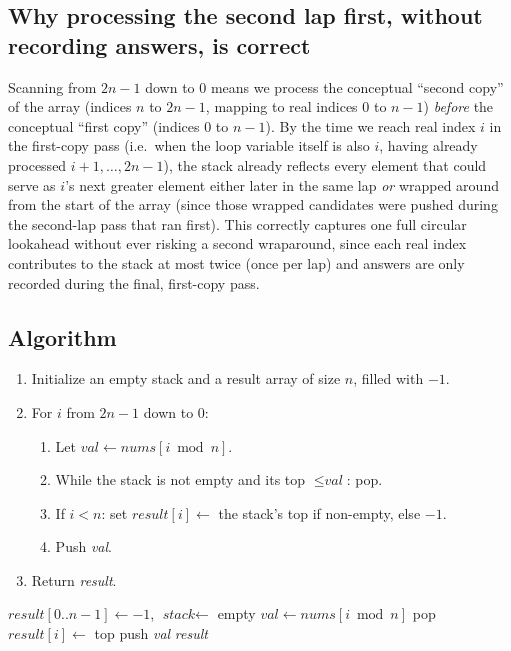 \subsection*{Why processing the second lap first, without recording answers, is correct}

Scanning from $2n-1$ down to $0$ means we process the conceptual ``second
copy'' of the array (indices $n$ to $2n-1$, mapping to real indices $0$
to $n-1$) \emph{before} the conceptual ``first copy'' (indices $0$ to
$n-1$). By the time we reach real index $i$ in the first-copy pass (i.e.\
when the loop variable itself is also $i$, having already processed
$i+1, \dots, 2n-1$), the stack already reflects every element that could
serve as $i$'s next greater element either later in the same lap
\emph{or} wrapped around from the start of the array (since those wrapped
candidates were pushed during the second-lap pass that ran first). This
correctly captures one full circular lookahead without ever risking a
second wraparound, since each real index contributes to the stack at most
twice (once per lap) and answers are only recorded during the final,
first-copy pass.

\subsection*{Algorithm}

\begin{enumerate}
  \item Initialize an empty stack and a result array of size $n$, filled
        with $-1$.
  \item For $i$ from $2n-1$ down to $0$:
  \begin{enumerate}
    \item Let $\textit{val} \gets \textit{nums}[i \bmod n]$.
    \item While the stack is not empty and its top $\le \textit{val}$:
          pop.
    \item If $i < n$: set $\textit{result}[i] \gets$ the stack's top if
          non-empty, else $-1$.
    \item Push \textit{val}.
  \end{enumerate}
  \item Return \textit{result}.
\end{enumerate}

\begin{algorithm}[H]
\caption{Next Greater Element II}
\begin{algorithmic}[1]
  \State $\textit{result}[0..n-1] \gets -1$, $\textit{stack} \gets$ empty
  \For{$i \gets 2n-1$ \textbf{down to} $0$}
    \State $\textit{val} \gets \textit{nums}[i \bmod n]$
      \State pop
    \EndWhile
      \State $\textit{result}[i] \gets$ top
    \EndIf
    \State push \textit{val}
  \EndFor
  \State \Return \textit{result}
\EndProcedure
\end{algorithmic}
\end{algorithm}

